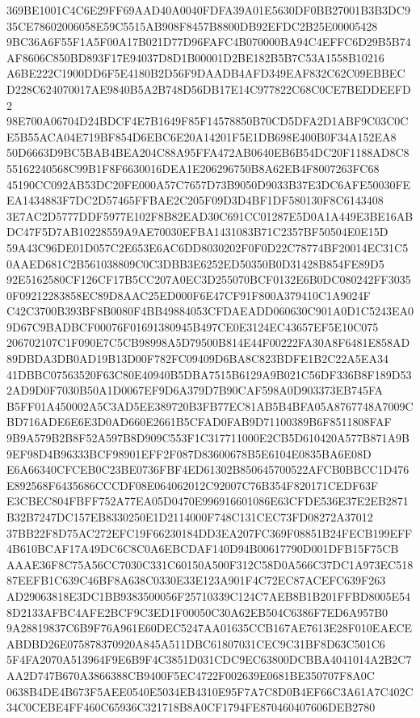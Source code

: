\documentclass[UTF8,fontset=fandol,zihao=-4,a4paper]{ctexart}
\begin{document}
{{369BE1001C4C6E29FF69AAD40A0040FDFA39A01E5630DF0BB27001B3B3DC935CE78602006058E59C5515AB908F8457B8800DB92EFDC2B25E00005428
9BC36A6F55F1A5F00A17B021D77D96FAFC4B070000BA94C4EFFC6D29B5B74AF8606C850BD893F17E94037D8D1B00001D2BE182B5B7C53A1558B10216
A6BE222C1900DD6F5E4180B2D56F9DAADB4AFD349EAF832C62C09EBBECD228C624070017AE9840B5A2B748D56DB17E14C977822C68C0CE7BEDDEEFD2
98E700A06704D24BDCF4E7B1649F85F14578850B70CD5DFA2D1ABF9C03C0CE5B55ACA04E719BF854D6EBC6E20A14201F5E1DB698E400B0F34A152EA8
50D6663D9BC5BAB4BEA204C88A95FFA472AB0640EB6B54DC20F1188AD8C855162240568C99B1F8F6630016DEA1E206296750B8A62EB4F8007263FC68
45190CC092AB53DC20FE000A57C7657D73B9050D9033B37E3DC6AFE50030FEEA1434883F7DC2D57465FFBAE2C205F09D3D4BF1DF580130F8C6143408
3E7AC2D5777DDF5977E102F8B82EAD30C691CC01287E5D0A1A449E3BE16ABDC47F5D7AB10228559A9AE70030EFBA1431083B71C2357BF50504E0E15D
59A43C96DE01D057C2E653E6AC6DD8030202F0F0D22C78774BF20014EC31C50AAED681C2B561038809C0C3DBB3E6252ED50350B0D31428B854FE89D5
92E5162580CF126CF17B5CC207A0EC3D255070BCF0132E6B0DC080242FF30350F09212283858EC89D8AAC25ED000F6E47CF91F800A379410C1A9024F
C42C3700B393BF8B0080F4BB49884053CFDAEADD060630C901A0D1C5243EA09D67C9BADBCF00076F01691380945B497CE0E3124EC43657EF5E10C075
206702107C1F090E7C5CB98998A5D79500B814E44F00222FA30A8F6481E858AD89DBDA3DB0AD19B13D00F782FC09409D6BA8C823BDFE1B2C22A5EA34
41DBBC07563520F63C80E40940B5DBA7515B6129A9B021C56DF336B8F189D532AD9D0F7030B50A1D0067EF9D6A379D7B90CAF598A0D903373EB745FA
B5FF01A450002A5C3AD5EE389720B3FB77EC81AB5B4BFA05A8767748A7009CBD716ADE6E6E3D0AD660E2661B5CFAD0FAB9D71100389B6F8511808FAF
9B9A579B2B8F52A597B8D909C553F1C317711000E2CB5D610420A577B871A9B9EF98D4B96333BCF98901EFF2F087D83600678B5E6104E0835BA6E08D
E6A66340CFCEB0C23BE0736FBF4ED61302B850645700522AFCB0BBCC1D476E892568F6435686CCCDF08E064062012C92007C76B354F820171CEDF63F
E3CBEC804FBFF752A77EA05D0470E996916601086E63CFDE536E37E2EB2871B32B7247DC157EB8330250E1D2114000F748C131CEC73FD08272A37012
37BB22F8D75AC272EFC19F66230184DD3EA207FC369F08851B24FECB199EFF4B610BCAF17A49DC6C8C0A6EBCDAF140D94B00617790D001DFB15F75CB
AAAE36F8C75A56CC7030C331C60150A500F312C58D0A566C37DC1A973EC51887EEFB1C639C46BF8A638C0330E33E123A901F4C72EC87ACEFC639F263
AD29063818E3DC1BB9383500056F25710339C124C7AEB8B1B201FFBD8005E548D2133AFBC4AFE2BCF9C3ED1F00050C30A62EB504C6386F7ED6A957B0
9A28819837C6B9F76A961E60DEC5247AA01635CCB167AE7613E28F010EAECEABDBD26E075878370920A845A511DBC61807031CEC9C31BF8D63C501C6
5F4FA2070A513964F9E6B9F4C3851D031CDC9EC63800DCBBA4041014A2B2C7AA2D747B670A3866388CB9400F5EC4722F002639E0681BE350707F8A0C
0638B4DE4B673F5AEE0540E5034EB4310E95F7A7C8D0B4EF66C3A61A7C402C34C0CEBE4FF460C65936C321718B8A0CF1794FE870460407606DEB2780
}}
\end{document}
